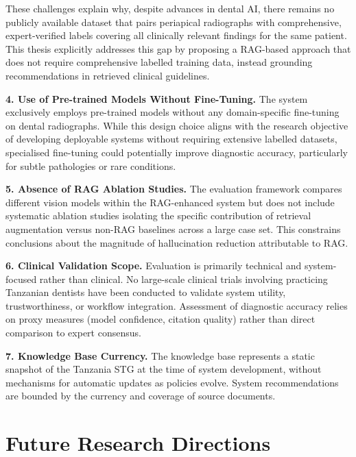 \documentclass[12pt,a4paper]{report}
\begin{document}
	These challenges explain why, despite advances in dental AI, there remains no publicly available dataset that pairs periapical radiographs with comprehensive, expert-verified labels covering all clinically relevant findings for the same patient. This thesis explicitly addresses this gap by proposing a RAG-based approach that does not require comprehensive labelled training data, instead grounding recommendations in retrieved clinical guidelines.
	
	\textbf{4. Use of Pre-trained Models Without Fine-Tuning.} The system exclusively employs pre-trained models without any domain-specific fine-tuning on dental radiographs. While this design choice aligns with the research objective of developing deployable systems without requiring extensive labelled datasets, specialised fine-tuning could potentially improve diagnostic accuracy, particularly for subtle pathologies or rare conditions.
	
	\textbf{5. Absence of RAG Ablation Studies.} The evaluation framework compares different vision models within the RAG-enhanced system but does not include systematic ablation studies isolating the specific contribution of retrieval augmentation versus non-RAG baselines across a large case set. This constrains conclusions about the magnitude of hallucination reduction attributable to RAG.
	
	\textbf{6. Clinical Validation Scope.} Evaluation is primarily technical and system-focused rather than clinical. No large-scale clinical trials involving practicing Tanzanian dentists have been conducted to validate system utility, trustworthiness, or workflow integration. Assessment of diagnostic accuracy relies on proxy measures (model confidence, citation quality) rather than direct comparison to expert consensus.
	
	\textbf{7. Knowledge Base Currency.} The knowledge base represents a static snapshot of the Tanzania STG at the time of system development, without mechanisms for automatic updates as policies evolve. System recommendations are bounded by the currency and coverage of source documents.
	
	\section{Future Research Directions}
	\label{sec:conclusion_future}
	
\end{document}
